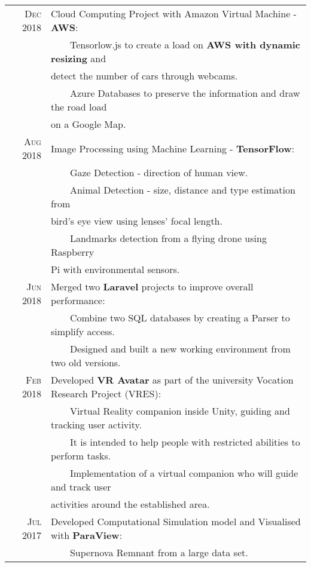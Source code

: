 \documentclass[a4paper,12pt]{article}
\newcommand{\tabitem}{~~\llap{\textbullet}~~}
\begin{document}
\begin{tabular}{rl}
        \textsc{Dec} 2018 & Cloud Computing Project with Amazon Virtual Machine - \textbf{AWS}: \\
            & \tabitem Tensorlow.js to create a load on \textbf{AWS with dynamic resizing} and \\
            & detect the number of cars through webcams. \\
            & \tabitem Azure Databases to preserve the information and draw the road load \\
            & on a Google Map.\\ [1pc]
            
        \textsc{Aug} 2018 & Image Processing using Machine Learning - \textbf{TensorFlow}: \\
            & \tabitem Gaze Detection - direction of human view. \\
            & \tabitem Animal Detection - size, distance and type estimation from \\
            & bird's eye view using lenses' focal length.\\ 
            & \tabitem Landmarks detection from a flying drone using Raspberry \\
            & Pi with environmental sensors. \\ [1pc]
            
		\textsc{Jun} 2018 & Merged two \textbf{Laravel} projects to improve overall performance: \\
		    & \tabitem Combine two SQL databases by creating a Parser to simplify access. \\
		    & \tabitem Designed and built a new working environment from two old versions. \\ [1pc]
		    
		\textsc{Feb} 2018 & Developed \textbf{VR Avatar} as part of the university Vocation Research Project (VRES): \\ 
		    & \tabitem Virtual Reality companion inside Unity, guiding and tracking user activity. \\
		    & \tabitem It is intended to help people with restricted abilities to perform tasks. \\ 
		    & \tabitem Implementation of a virtual companion who will guide and track user \\ & activities around the established area.\\ [1pc]
		    
		\textsc{Jul} 2017 & Developed Computational Simulation model and Visualised with \textbf{ParaView}: \\
		    & \tabitem Supernova Remnant from a large data set. \\ [1pc]
		    

\end{tabular}
\end{document}

